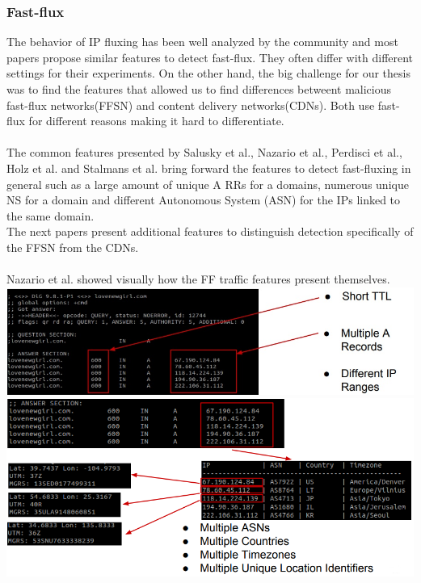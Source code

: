 \subsubsection{Fast-flux}
The behavior of IP fluxing has been well analyzed by the community and most papers propose similar features to detect fast-flux. They often differ with different settings for their experiments. On the other hand, the big challenge for our thesis was to find the features that allowed us to find differences betweent malicious fast-flux networks(FFSN) and content delivery networks(CDNs). Both use fast-flux for different reasons making it hard to differentiate.\\
\\
The common features presented by  Salusky et al.\cite{honeynet}, Nazario et al.\cite{ff1}, Perdisci et al.\cite{ff2}, Holz et al.\cite{ff3} and Stalmans et al.\cite{ff_botconf} bring forward the features to detect fast-fluxing in general such as a large amount of unique A RRs for a domains, numerous unique NS for a domain and different Autonomous System (ASN) for the IPs linked to the same domain. \\
The next papers present additional features to distinguish detection specifically of the FFSN from the CDNs. \\
\\
Nazario et al. \cite{ff1} showed visually how the FF traffic features present themselves.
\includegraphics[scale=.7]{img/ff_features.jpg}\\
\includegraphics[scale=.6]{img/ff_features_2.png}
\\
